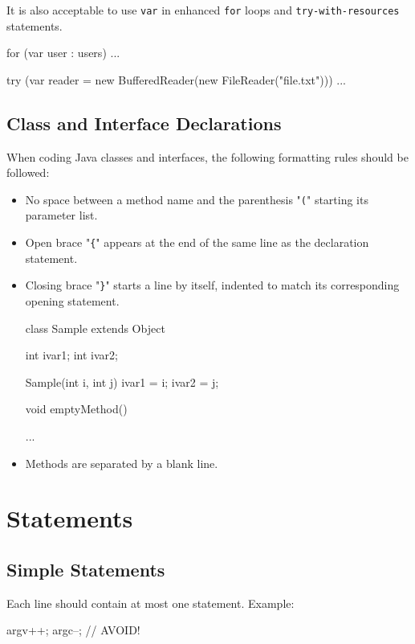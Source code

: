 \documentclass{article}
\begin{document}
It is also acceptable to use \texttt{var} in enhanced \texttt{for} loops and
\texttt{try-with-resources} statements.

\begin{snippet}
for (var user : users) {
    ...
}

try (var reader = new BufferedReader(new FileReader("file.txt"))) {
    ...
}
\end{snippet}

\subsection{Class and Interface Declarations}

When coding Java classes and interfaces, the following formatting rules should be followed:

\begin{itemize}
\item No space between a method name and the parenthesis "\texttt{(}" starting its parameter list.
\item Open brace "\texttt{\{}" appears at the end of the same line as the declaration statement.
\item Closing brace "\texttt{\}}" starts a line by itself, indented to match its corresponding
  opening statement. \\
\begin{snippet}
class Sample extends Object {
    int ivar1;
    int ivar2;

    Sample(int i, int j) {
        ivar1 = i;
        ivar2 = j;
    }

    void emptyMethod() {
    }

    ...
}
\end{snippet}
\item Methods are separated by a blank line.
\end{itemize}

\section{Statements}

\subsection{Simple Statements}

Each line should contain at most one statement. Example:

\begin{snippet}
argv++; argc--; // AVOID!
\end{snippet}
\end{document}
